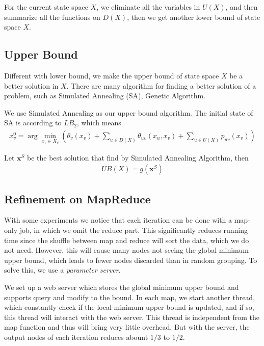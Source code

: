For the current state space $X$, we eliminate all the variables in $U(X)$, and then summarize all the functions on $D(X)$, then we get another lower bound of state space $X$.

\subsection{Upper Bound}
Different with lower bound, we make the upper bound of state space $X$ be a better solution in $X$. There are many algorithm for finding a better solution of a problem, such as Simulated Annealing (SA), Genetic Algorithm.

We use Simulated Annealing as our upper bound algorithm. The initial state of SA is according to $LB_2$, which means
\begin{align*}
x_v^{0}\!=\!\arg\!\min_{x_v\in X_v}\left(\theta_v(x_v)\!+\!\sum_{u\in D(X)}\theta_{uv}(x_u,x_v)\!+\!\sum_{u\in U(X)}p_{uv}(x_v)\right)
\end{align*}

Let $\mathbf{x}^{S}$ be the best solution that find by Simulated Annealing Algorithm, then
\begin{align*}
  UB(X)=g(\mathbf{x}^{S})
\end{align*}

\subsection{Refinement on MapReduce}
    With some experiments we notice that each iteration can be done with a map-only job, in which we omit the reduce part. This significantly reduces running time since the shuffle between map and reduce will sort the data, which we do not need. However, this will cause many nodes not seeing the global minimum upper bound, which leads to fewer nodes discarded than in random grouping. To solve this, we use a \textit{parameter server}.

    We set up a web server which stores the global minimum upper bound and supports query and modify to the bound. In each map, we start another thread, which constantly check if the local minimum upper bound is updated, and if so, this thread will interact with the web server. This thread is independent from the map function and thus will bring very little overhead. But with the server, the output nodes of each iteration reduces abount $1/3$ to $1/2$.
